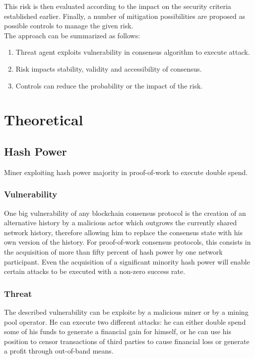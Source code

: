 \documentclass[11pt,a4paper,draft]{article}
\begin{document}
This risk is then evaluated according to the impact on the security criteria established earlier. Finally, a number of mitigation possibilities are proposed as possible controls to manage the given risk.\\

The approach can be summarized as follows:
\begin{enumerate}
  \item Threat agent exploits vulnerability in consensus algorithm to execute attack.
  \item Risk impacts stability, validity and accessibility of consensus.
  \item Controls can reduce the probability or the impact of the risk.
\end{enumerate}

\section{Theoretical}

\subsection{Hash Power}

Miner exploiting hash power majority in proof-of-work to execute double spend.\\

\subsubsection{Vulnerability}

One big vulnerability of any blockchain consensus protocol is the creation of an alternative history by a malicious actor which outgrows the currently shared network history, therefore allowing him to replace the consensus state with his own version of the history. For proof-of-work consensus protocols, this consists in the acquisition of more than fifty percent of hash power by one network participant. Even the acquisition of a significant minority hash power will enable certain attacks to be executed with a non-zero success rate.\\

\subsubsection{Threat}

The described vulnerability can be exploite by a malicious miner or by a mining pool operator. He can execute two different attacks: he can either double spend some of his funds to generate a financial gain for himself, or he can use his position to censor transactions of third parties to cause financial loss or generate a profit through out-of-band means.\\
\end{document}
